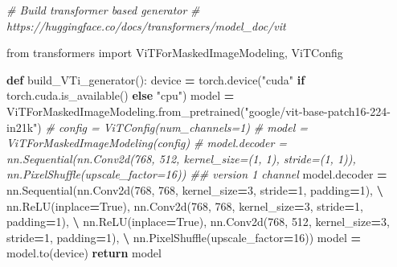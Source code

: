 \documentclass[
]{article}
\newenvironment{Shaded}{\begin{snugshade}}{\end{snugshade}}
\newcommand{\CommentTok}[1]{\textcolor[rgb]{0.56,0.35,0.01}{\textit{#1}}}
\newcommand{\ControlFlowTok}[1]{\textcolor[rgb]{0.13,0.29,0.53}{\textbf{#1}}}
\newcommand{\DecValTok}[1]{\textcolor[rgb]{0.00,0.00,0.81}{#1}}
\newcommand{\ImportTok}[1]{#1}
\newcommand{\KeywordTok}[1]{\textcolor[rgb]{0.13,0.29,0.53}{\textbf{#1}}}
\newcommand{\NormalTok}[1]{#1}
\newcommand{\OperatorTok}[1]{\textcolor[rgb]{0.81,0.36,0.00}{\textbf{#1}}}
\newcommand{\StringTok}[1]{\textcolor[rgb]{0.31,0.60,0.02}{#1}}
\newcommand{\VariableTok}[1]{\textcolor[rgb]{0.00,0.00,0.00}{#1}}
\begin{document}
\begin{Shaded}
\begin{Highlighting}[]
\CommentTok{\# Build transformer based generator}
\CommentTok{\# https://huggingface.co/docs/transformers/model\_doc/vit}

\ImportTok{from}\NormalTok{ transformers }\ImportTok{import}\NormalTok{ ViTForMaskedImageModeling, ViTConfig}


\KeywordTok{def}\NormalTok{ build\_VTi\_generator():}
\NormalTok{    device }\OperatorTok{=}\NormalTok{ torch.device(}\StringTok{"cuda"} \ControlFlowTok{if}\NormalTok{ torch.cuda.is\_available() }\ControlFlowTok{else} \StringTok{"cpu"}\NormalTok{)}
\NormalTok{    model }\OperatorTok{=}\NormalTok{ ViTForMaskedImageModeling.from\_pretrained(}\StringTok{"google/vit{-}base{-}patch16{-}224{-}in21k"}\NormalTok{)}
\CommentTok{\#    config = ViTConfig(num\_channels=1)}
\CommentTok{\#    model = ViTForMaskedImageModeling(config)}
\CommentTok{\#    model.decoder = nn.Sequential(nn.Conv2d(768, 512, kernel\_size=(1, 1), stride=(1, 1)), nn.PixelShuffle(upscale\_factor=16))   \#\# version 1 channel}
\NormalTok{    model.decoder }\OperatorTok{=}\NormalTok{ nn.Sequential(nn.Conv2d(}\DecValTok{768}\NormalTok{, }\DecValTok{768}\NormalTok{, kernel\_size}\OperatorTok{=}\DecValTok{3}\NormalTok{, stride}\OperatorTok{=}\DecValTok{1}\NormalTok{, padding}\OperatorTok{=}\DecValTok{1}\NormalTok{), }\OperatorTok{\textbackslash{}}
\NormalTok{                                    nn.ReLU(inplace}\OperatorTok{=}\VariableTok{True}\NormalTok{),}
\NormalTok{                                    nn.Conv2d(}\DecValTok{768}\NormalTok{, }\DecValTok{768}\NormalTok{, kernel\_size}\OperatorTok{=}\DecValTok{3}\NormalTok{, stride}\OperatorTok{=}\DecValTok{1}\NormalTok{, padding}\OperatorTok{=}\DecValTok{1}\NormalTok{), }\OperatorTok{\textbackslash{}}
\NormalTok{                                    nn.ReLU(inplace}\OperatorTok{=}\VariableTok{True}\NormalTok{),}
\NormalTok{                                    nn.Conv2d(}\DecValTok{768}\NormalTok{, }\DecValTok{512}\NormalTok{, kernel\_size}\OperatorTok{=}\DecValTok{3}\NormalTok{, stride}\OperatorTok{=}\DecValTok{1}\NormalTok{, padding}\OperatorTok{=}\DecValTok{1}\NormalTok{), }\OperatorTok{\textbackslash{}}
\NormalTok{                                    nn.PixelShuffle(upscale\_factor}\OperatorTok{=}\DecValTok{16}\NormalTok{))}
\NormalTok{    model }\OperatorTok{=}\NormalTok{ model.to(device)}
    \ControlFlowTok{return}\NormalTok{ model}
\end{Highlighting}
\end{Shaded}
\end{document}
